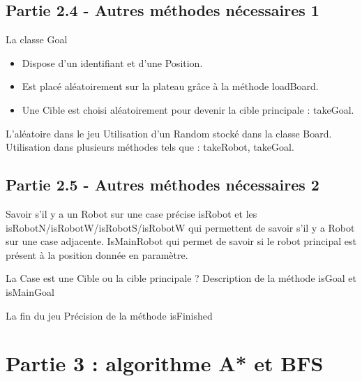 \documentclass{beamer} %
\begin{document}
	\subsection{Partie 2.4 - Autres méthodes nécessaires 1}
\begin{frame}[plain]
\begin{exampleblock}{La classe Goal}
	\begin{itemize}
		\item Dispose d'un identifiant et d'une Position.
		\item Est placé aléatoirement sur la plateau grâce à la méthode loadBoard.
		\item Une Cible est choisi aléatoirement pour devenir la cible principale : takeGoal.
	\end{itemize}
\end{exampleblock}
\begin{exampleblock}{L'aléatoire dans le jeu}
Utilisation d'un Random stocké dans la classe Board.
Utilisation dans plusieurs méthodes tels que : takeRobot, takeGoal.
\end{exampleblock}


	\subsection{Partie 2.5 - Autres méthodes nécessaires 2}
\begin{exampleblock}{Savoir s'il y a un Robot sur une case précise}
isRobot et les isRobotN/isRobotW/isRobotS/isRobotW qui permettent de savoir s'il y a Robot sur une case adjacente.
IsMainRobot qui permet de savoir si le robot principal est présent à la position donnée en paramètre.
\end{exampleblock}
\begin{exampleblock}{La Case est une Cible ou la cible principale ?}
Description de la méthode isGoal et isMainGoal
\end{exampleblock}

\begin{exampleblock}{La fin du jeu}
Précision de la méthode isFinished
\end{exampleblock}

\end{frame}


\section{Partie 3 : algorithme A* et BFS}
\end{document}
